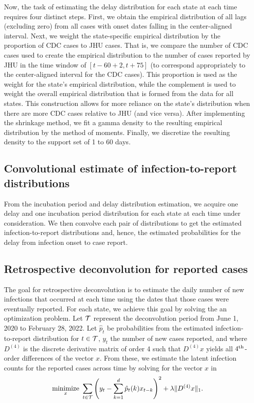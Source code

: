 \documentclass{article}
\begin{document}
Now, the task of estimating the delay distribution for each state at each time
requires four distinct steps. First, we obtain the empirical
distribution of all lags (excluding zero) from all cases with onset dates
falling in the center-aligned interval. Next, we weight the state-specific
empirical distribution by the proportion of CDC cases to JHU cases. That is, we
compare the number of CDC cases used to create the empirical distribution to the
number of cases reported by JHU in the time window of $\left[t - 60 + 2, t +
75\right]$ (to correspond appropriately to the center-aligned interval for
the CDC cases). This proportion is used as the weight for the state's empirical
distribution, while the complement is used to weight the overall empirical
distribution that is formed from the data for all states. This construction
allows for more reliance on the state's distribution when there are more CDC
cases relative to JHU (and vice versa). After implementing the shrinkage method,
we fit a gamma density to the resulting empirical distribution by the method of
moments. Finally, we discretize the resulting density to the support set of 1
to 60 days.
 
\subsection{Convolutional estimate of infection-to-report distributions} 

From the incubation period and delay distribution estimation, we acquire one
delay and one incubation period distribution for each state at each time under
consideration. We then convolve each pair of distributions to get the estimated
infection-to-report distributions and, hence, the estimated probabilities for
the delay from infection onset to case report. 

\subsection{Retrospective deconvolution for reported cases}

The goal for retrospective deconvolution is to estimate the daily number of new
infections that occurred at each time using the dates that those cases were eventually
reported. For each state, we
achieve this goal by solving the an optimization problem. 
Let $\mathcal{T}$ represent the deconvolution period from June
1, 2020 to February 28, 2022. Let $\hat{p}_t$ be probabilities from the estimated
infection-to-report distribution for $t \in \mathcal{T}$, $y_t$ the number of new cases
reported, and where $D^{(4)}$ is the discrete derivative matrix of order 4
such that $D^{(4)}x$ yields all $4^{\textnormal{th}}$-order differences of the vector $x$. From these,
we estimate the latent infection counts for the reported cases across time by
solving for the vector $x$ in
\begin{align*}
\operatorname*{minimize}_{x}\ \sum_{t \in \mathcal{T}} \left ( y_t -  \sum_{k = 1}^{d} \hat{p}_t(k)x_{t-k} 
\right )^2 + \lambda \|D^{(4)}x\|_1. 
\end{align*}
\end{document}

